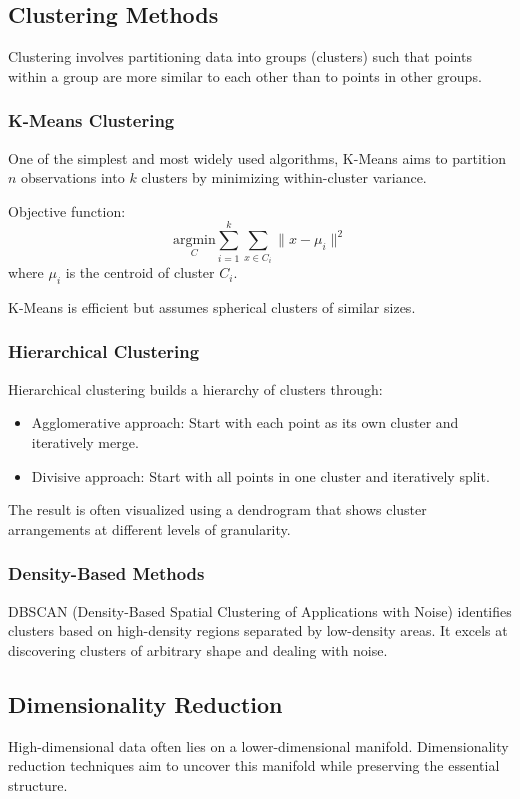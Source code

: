 \documentclass[openany]{book}
\begin{document}
\subsection{Clustering Methods}
Clustering involves partitioning data into groups (clusters) such that points 
within a group are more similar to each other than to points in other groups.

\subsubsection{K-Means Clustering}
One of the simplest and most widely used algorithms, K-Means aims to partition 
\( n \) observations into \( k \) clusters by minimizing within-cluster 
variance.

Objective function:
\[
\underset{C}{\text{argmin}} \sum_{i=1}^{k} \sum_{x \in C_i} \| x - \mu_i \|^2
\]
where \( \mu_i \) is the centroid of cluster \( C_i \).

K-Means is efficient but assumes spherical clusters of similar sizes.

\subsubsection{Hierarchical Clustering}
Hierarchical clustering builds a hierarchy of clusters through:
\begin{itemize}
    \item Agglomerative approach: Start with each point as its own cluster and 
    iteratively merge.
    \item Divisive approach: Start with all points in one cluster and 
    iteratively split.
\end{itemize}
The result is often visualized using a dendrogram that shows cluster 
arrangements at different levels of granularity.

\subsubsection{Density-Based Methods}
DBSCAN (Density-Based Spatial Clustering of Applications with Noise) identifies 
clusters based on high-density regions separated by low-density areas. It 
excels at discovering clusters of arbitrary shape and dealing with noise.

\subsection{Dimensionality Reduction}
High-dimensional data often lies on a lower-dimensional manifold. Dimensionality 
reduction techniques aim to uncover this manifold while preserving the essential 
structure.
\end{document}
